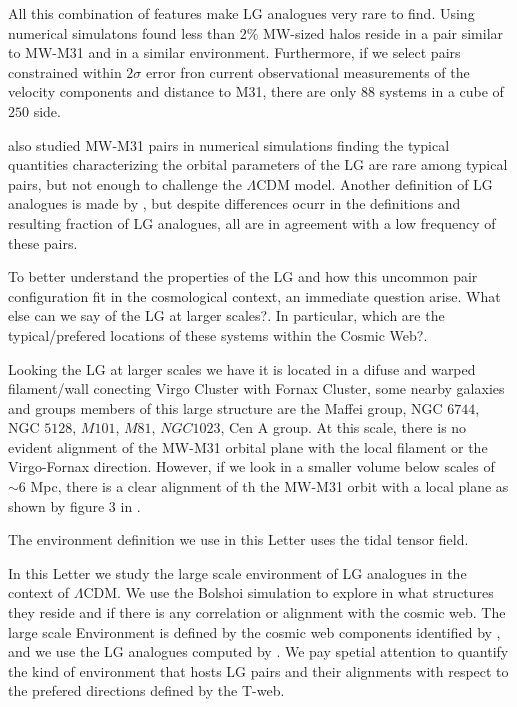 \documentclass{emulateapj}
\newcommand{\lcdm}{$\Lambda$CDM }
\newcommand{\mpc}{\rm{Mpc}}
\newcommand{\hmpc}{{\ifmmode{h^{-1}{\rm Mpc}}\else{$h^{-1}$Mpc }\fi}}
\begin{document}
All this combination of features make LG analogues very rare to
find. Using numerical simulatons \citet{lganalogues} found less than
$2\%$ MW-sized halos reside in a pair similar to MW-M31 and in a
similar environment. Furthermore, if we select pairs constrained
within $2\sigma$ error fron current observational measurements of the
velocity components and distance to M31, there are only $88$ systems
in a cube of $250$ \hmpc side. 

\citet{2013ApJ...767L...5F} also studied MW-M31 pairs in numerical
simulations finding the typical quantities characterizing the orbital
parameters of the LG are rare among typical pairs, but not enough to
challenge the \lcdm model. 
Another definition of LG analogues is made by
\citet{2008MNRAS.384.1459L}, but despite differences ocurr in the
definitions and resulting fraction of LG analogues, all are in
agreement with a low frequency of these pairs. 

To better understand the properties of the LG and how this uncommon
pair configuration fit in the cosmological context, an immediate
question arise. What else can we say of the LG at larger scales?. In
particular, which are the typical/prefered locations of these systems
within the Cosmic Web?.

Looking the LG at larger scales we have it is located in a difuse and
warped filament/wall conecting Virgo Cluster with Fornax Cluster, some
nearby galaxies and groups members of this large structure are the
Maffei group, NGC $6744$, NGC $5128$, $M101$, $M81$, $NGC1023$, Cen A
group. At this scale, there is no evident alignment of the MW-M31
orbital plane with the local filament or the Virgo-Fornax
direction. However, if we look in a smaller volume below scales of
$\sim 6$ \mpc, there is a clear alignment of th the MW-M31 orbit with
a local plane as shown by figure $3$ in \citet{2013AJ....146...69C}.  


The environment definition we use in this Letter uses the tidal tensor
field. 

In this Letter we study the large scale environment of LG 
analogues in the context of $\Lambda$CDM. We use the Bolshoi
simulation to explore in what structures they reside and if there is
any correlation or alignment with the cosmic web. The large scale
Environment is defined by the cosmic web components identified by
\citet{Tweb}, and we use the LG analogues computed by
\citet{lganalogues}. We pay spetial attention to quantify the kind of
environment that hosts LG pairs and their alignments with respect to
the prefered directions defined by the T-web. 
   
\end{document}
